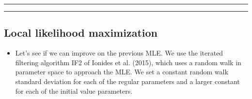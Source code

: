 \documentclass[]{article}
\providecommand{\tightlist}{%
  \setlength{\itemsep}{0pt}\setlength{\parskip}{0pt}}
\begin{document}
\begin{center}\rule{0.5\linewidth}{\linethickness}\end{center}

\begin{center}\rule{0.5\linewidth}{\linethickness}\end{center}

\subsection{Local likelihood
maximization}\label{local-likelihood-maximization}

\begin{itemize}
\tightlist
\item
  Let's see if we can improve on the previous MLE. We use the iterated
  filtering algorithm IF2 of Ionides et al. (2015), which uses a random
  walk in parameter space to approach the MLE. We set a constant random
  walk standard deviation for each of the regular parameters and a
  larger constant for each of the initial value parameters.
\end{itemize}
\end{document}
